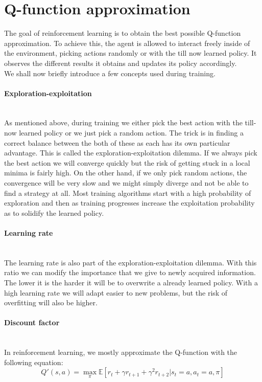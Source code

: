  \section{Q-function approximation} 
The goal of reinforcement learning is to obtain the best possible Q-function approximation. To achieve this, the agent is allowed to interact freely inside of the environment, picking actions randomly or with the till now learned policy. It observes the different results it obtains and updates its policy accordingly.\\ 
We shall now briefly introduce a few concepts used during training.
\paragraph{Exploration-exploitation} \mbox{}\\
As mentioned above, during training we either pick the best action with the till-now learned policy or we just pick a random action. The trick is in finding a correct balance between the both of these as each has its own particular advantage. This is called the exploration-exploitation dilemma\cite{yogeswaran2012reinforcement}. If we always pick the best action we will converge quickly but the risk of getting stuck in a local minima is fairly high. On the other hand, if we only pick random actions, the convergence will be very slow and we might simply diverge and not be able to find a strategy at all. Most training algorithms start with a high probability of exploration and then as training progresses increase the exploitation probability as to solidify the learned policy.
\paragraph{Learning rate}\mbox{}\\
The learning rate is also part of the exploration-exploitation dilemma. With this ratio we can modify the importance that we give to newly acquired information. The lower it is the harder it will be to overwrite a already learned policy. With a high learning rate we will adapt easier to new problems, but the risk of overfitting will also be higher.

\paragraph{Discount factor}\mbox{}\\
In reinforcement learning, we mostly approximate the Q-function with the following equation:
\begin{equation}
	Q'(s,a) = \max_{\pi} \mathbb{E}[r_t+\gamma r_{t+1}+\gamma^2 r_{t+2}| s_t=a, a_t = a,\pi]
\end{equation}

